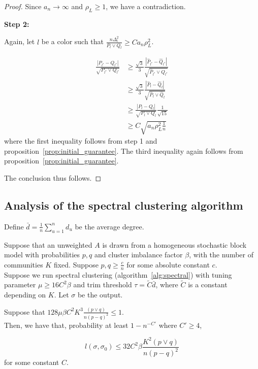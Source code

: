 \begin{proof}
Since $a_n \rightarrow \infty$ and $\rho_L \geq 1$, we have a contradiction. 

\textbf{Step 2:}

Again, let $l$ be a color such that $\frac{n \Delta_l^2}{P_l \vee Q_l} \geq C a_n \rho^2_L$.

\begin{align*}
\frac{ |P_{l^*} - Q_{l^*}|}{\sqrt{ P_{l^*} \vee Q_{l^*}}} &\geq 
\frac{\sqrt{3}}{3} \frac{|\hat{P}_{l^*} - \hat{Q}_{l^*} | }{\sqrt{ \hat{P}_{l^*} \vee \hat{Q}_{l^*} }} 
  \\
& \geq
\frac{\sqrt{3}}{3} \frac{|\hat{P}_l - \hat{Q}_l | }{\sqrt{ \hat{P}_l \vee \hat{Q}_l}}  \\
 &\geq \frac{|P_l - Q_l|}{\sqrt{P_l \vee Q_l}} \frac{1}{\sqrt{15}}  \\
 &\geq C \sqrt{a_n \rho^2_L \frac{1}{n} }
\end{align*}
where the first inequality follows from step 1 and proposition~\ref{prop:initial_guarantee}. The third inequality again follows from proposition~\ref{prop:initial_guarantee}.

The conclusion thus follows.
\end{proof}

\subsection{Analysis of the spectral clustering algorithm}

Define $\bar{d} = \frac{1}{n} \sum_{u=1}^n d_u$ be the average degree.

\begin{proposition}
\label{prop:spectral_analysis}
Suppose that an unweighted $A$ is drawn from a homogeneous stochastic block model with probabilities $p, q$ and cluster imbalance factor $\beta$, with the number of communities $K$ fixed. Suppose $p, q \geq \frac{c}{n}$ for some absolute constant $c$. \\

Suppose we run spectral clustering (algorithm~\ref{alg:spectral}) with tuning parameter $\mu \geq 16 C^2 \beta$ and trim threshold $\tau = \tilde{C} \bar{d}$, where $\tilde{C}$ is a constant depending on $K$. Let $\sigma$ be the output. 

Suppose that $128 \mu \beta C^2 K^3 \frac{(p \vee q)}{n (p-q)^2} \leq 1$. \\

Then, we have that, probability at least $1 - n^{-C'}$ where $C' \geq 4$, 

\[
l(\sigma, \sigma_0) \leq 32 C^2 \beta  \frac{K^2 (p \vee q) }{n (p-q)^2}
\]
for some constant $C$. 

\end{proposition}

